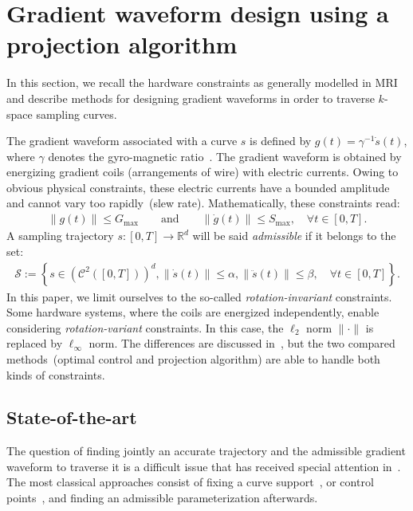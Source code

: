 \documentclass{article}
\begin{document}
\section{Gradient waveform design using a projection algorithm}
In this section, we recall the hardware constraints as generally model\-led in MRI and describe methods for designing gradient waveforms in order to traverse $k$-space sampling curves.

The gradient waveform associated with a curve $s$ is defined by $ g(t)=\gamma^{-1} \dot{s} (t)$, where $\gamma$ denotes the gyro-magnetic ratio~\cite{Hargreaves04}.
The gradient waveform is obtained by energizing gradient coils (arrangements of wire) with electric currents.
Owing to obvious physical constraints, these electric currents have a bounded amplitude and cannot vary too rapidly~(slew rate). Mathematically, these constraints read: 
\begin{align*}
\|g(t)\| \leqslant G_{\max} \qquad \mbox{and} \qquad \|\dot g(t)\| \leqslant S_{\max}, \quad \forall t \in [0,T].
\end{align*}
A sampling trajectory $s:[0,T]\to {\mathbb{R}}^d$ will be said \emph{admissible} if it belongs to the set:
\begin{align*}
\mathcal{S}:=\left\{s\in \left(\mathcal{C}^2([0,T])\right)^d, \|\dot s(t)\| \leqslant \alpha , \|\ddot s(t)\| \leqslant \beta, \quad \forall t \in [0,T] \right\}.
\end{align*}
In this paper, we limit ourselves to the so-called  \emph{rotation-invariant} constraints. Some hardware systems, where the coils are energized independently, enable considering \emph{rotation-variant} constraints. In this case, the $\ell_2$ norm $\| \cdot \|$ is replaced by $\ell_\infty$ norm. The differences are discussed in~\cite{Vaziri13}, but the two compared methods~(optimal control and projection algorithm) are able to handle both kinds of constraints. 

\subsection{State-of-the-art}
The question of finding jointly an accurate trajectory and the admissible gradient waveform to traverse it is a difficult issue that has received special attention in~\cite{Dale04,Mir04}. The most classical approaches consist of fixing a curve support~\cite{Lustig08,Vaziri13}, or control points~\cite{Hargreaves04,Davids14b}, and finding an admissible parameterization afterwards.
\end{document}
